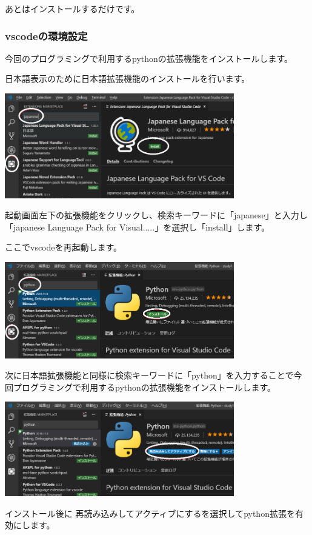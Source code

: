 \documentclass[11pt,a4paper,dvipdfmx,titlepage]{jsreport}
\begin{document}
あとはインストールするだけです。

\subsubsection{vscodeの環境設定}

今回のプログラミングで利用するpythonの拡張機能をインストールします。

日本語表示のために日本語拡張機能のインストールを行います。



\includegraphics[width=10cm]{images/image2.png}

起動画面左下の拡張機能をクリックし、検索キーワードに「japanese」と入力し
「japanese Language Pack for Visual.....」を選択し「install」します。


ここでvscodeを再起動します。


\includegraphics[width=10cm]{images/image6.png}

次に日本語拡張機能と同様に検索キーワードに「python」を入力することで今回プログラミングで利用するpythonの拡張機能をインストールします。

\includegraphics[width=10cm]{images/image10.png}

インストール後に
再読み込みしてアクティブにするを選択してpython拡張を有効にします。
\end{document}
